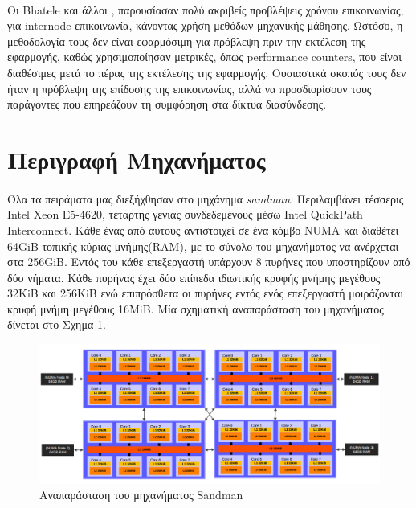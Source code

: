 \paragraph{}
Οι Bhatele και άλλοι \cite{bhatele}, παρουσίασαν πολύ ακριβείς προβλέψεις χρόνου επικοινωνίας, για internode επικοινωνία, κάνοντας χρήση μεθόδων μηχανικής μάθησης. Ωστόσο, η μεθοδολογία τους δεν είναι εφαρμόσιμη για πρόβλεψη πριν την εκτέλεση της εφαρμογής, καθώς χρησιμοποίησαν μετρικές, όπως performance counters, που είναι διαθέσιμες μετά το πέρας της εκτέλεσης της εφαρμογής. Ουσιαστικά σκοπός τους δεν ήταν η πρόβλεψη της επίδοσης της επικοινωνίας, αλλά να προσδιορίσουν τους παράγοντες που επηρεάζουν τη συμφόρηση στα δίκτυα διασύνδεσης.

\section{Περιγραφή Μηχανήματος}
\paragraph{}
Όλα τα πειράματα μας διεξήχθησαν στο μηχάνημα \textit{sandman}. Περιλαμβάνει τέσσερις Intel Xeon E5-4620, τέταρτης γενιάς  συνδεδεμένους  μέσω Intel QuickPath Interconnect. Κάθε ένας από αυτούς αντιστοιχεί σε ένα κόμβο NUMA και διαθέτει 64GiB τοπικής κύριας μνήμης(RAM), με το σύνολο του μηχανήματος να ανέρχεται στα 256GiB. Εντός του κάθε επεξεργαστή υπάρχουν 8 πυρήνες που υποστηρίζουν από δύο νήματα. Κάθε πυρήνας έχει  δύο επίπεδα ιδιωτικής κρυφής μνήμης μεγέθους 32KiB και 256KiB ενώ επιπρόσθετα οι πυρήνες εντός ενός επεξεργαστή μοιράζονται κρυφή μνήμη μεγέθους 16MiB. Μία σχηματική αναπαράσταση του μηχανήματος δίνεται στο Σχημα \ref{fig:sandman}.  
\begin{figure}[ht]
    \centering
    \includegraphics[width=1.1\textwidth]{./images/sandman.png}
    \caption{Αναπαράσταση του μηχανήματος Sandman}
    \label{fig:sandman}
\end{figure}
